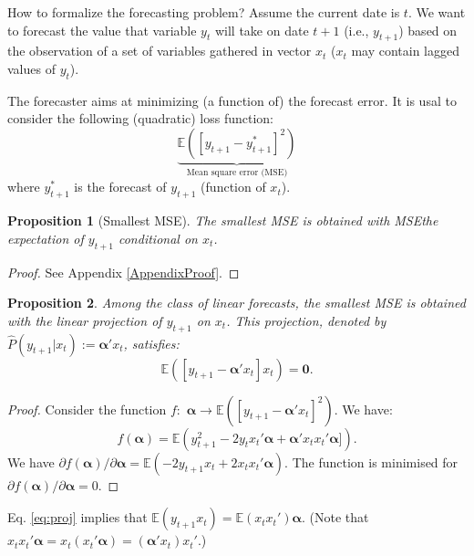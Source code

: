 \documentclass[
  12pt,
]{book}
\newtheorem{proposition}{Proposition}[chapter]
\theoremstyle{definition}
\theoremstyle{definition}
\theoremstyle{definition}
\theoremstyle{definition}
\theoremstyle{remark}
\begin{document}
How to formalize the forecasting problem? Assume the current date is \(t\). We want to forecast the value that variable \(y_t\) will take on date \(t+1\) (i.e., \(y_{t+1}\)) based on the observation of a set of variables gathered in vector \(x_t\) (\(x_t\) may contain lagged values of \(y_t\)).

The forecaster aims at minimizing (a function of) the forecast error. It is usal to consider the following (quadratic) loss function:
\[
\underbrace{\mathbb{E}([y_{t+1} - y^*_{t+1}]^2)}_{\mbox{Mean square error (MSE)}}
\]
where \(y^*_{t+1}\) is the forecast of \(y_{t+1}\) (function of \(x_t\)).

\begin{proposition}[Smallest MSE]
\protect\hypertarget{prp:smallestMSE}{}\label{prp:smallestMSE}The smallest MSE is obtained with MSEthe expectation of \(y_{t+1}\) conditional on \(x_t\).
\end{proposition}

\begin{proof}
See Appendix \ref{AppendixProof}.
\end{proof}

\begin{proposition}
\protect\hypertarget{prp:smallestMSElinear}{}\label{prp:smallestMSElinear}Among the class of linear forecasts, the smallest MSE is obtained with the linear projection of \(y_{t+1}\) on \(x_t\).
This projection, denoted by \(\hat{P}(y_{t+1}|x_t):=\boldsymbol\alpha'x_t\), satisfies:
\begin{equation}
\mathbb{E}\left( [y_{t+1} - \boldsymbol\alpha'x_t]x_t \right)=\mathbf{0}.\label{eq:proj}
\end{equation}
\end{proposition}

\begin{proof}
Consider the function \(f:\) \(\boldsymbol\alpha \rightarrow \mathbb{E}\left( [y_{t+1} - \boldsymbol\alpha'x_t]^2 \right)\). We have:
\[
f(\boldsymbol\alpha) = \mathbb{E}\left( y_{t+1}^2 - 2 y_t x_t'\boldsymbol\alpha + \boldsymbol\alpha'x_t x_t'\boldsymbol\alpha] \right).
\]
We have \(\partial f(\boldsymbol\alpha)/\partial \boldsymbol\alpha = \mathbb{E}(-2 y_{t+1} x_t + 2 x_t x_t'\boldsymbol\alpha)\). The function is minimised for \(\partial f(\boldsymbol\alpha)/\partial \boldsymbol\alpha =0\).
\end{proof}

Eq. \eqref{eq:proj} implies that \(\mathbb{E}\left( y_{t+1}x_t \right)=\mathbb{E}\left(x_tx_t' \right)\boldsymbol\alpha\). (Note that \(x_t x_t'\boldsymbol\alpha=x_t (x_t'\boldsymbol\alpha)=(\boldsymbol\alpha'x_t) x_t'\).)
\end{document}
